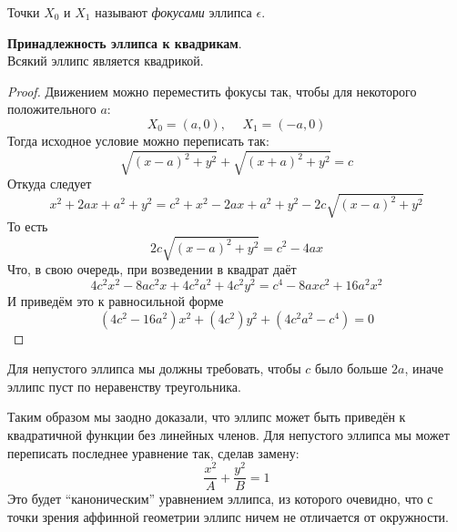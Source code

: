 \documentclass[11pt]{article}
\begin{document}
    \begin{remark}
    Точки $X_0$ и $X_1$ называют \emph{фокусами} эллипса $\epsilon$.
    \end{remark}

    \begin{lemma}
    \textbf{Принадлежность эллипса к квадрикам}.\\ Всякий эллипс является квадрикой.
    \end{lemma}

    \begin{proof}
    Движением можно переместить фокусы так, чтобы для некоторого положительного $a$:
    \begin{equation*}
        X_0 = (a, 0), \hspace{15pt} X_1 = (-a, 0)
    \end{equation*}
    Тогда исходное условие можно переписать так:
    \begin{equation*}
        \sqrt{(x - a)^2 + y^2} + \sqrt{(x + a)^2 + y^2} = c
    \end{equation*}
    Откуда следует
    \begin{equation*}
        x^2 + 2ax + a^2 + y^2 = c^2 + x^2 -2ax + a^2 + y^2 - 2c\sqrt{(x - a)^2 + y^2}
    \end{equation*}
    То есть
    \begin{equation*}
        2c\sqrt{(x - a)^2 + y^2} = c^2 - 4ax
    \end{equation*}
    Что, в свою очередь, при возведении в квадрат даёт
    \begin{equation*}
        4c^2x^2 - 8ac^2x + 4c^2a^2 + 4c^2y^2 = c^4 - 8axc^2 + 16a^2x^2
    \end{equation*}
    И приведём это к равносильной форме
    \begin{equation*}
        (4c^2 - 16a^2)x^2 + (4c^2)y^2 + (4c^2a^2 - c^4) = 0
    \end{equation*}
    \end{proof}

    \begin{remark}
    Для непустого эллипса мы должны требовать, чтобы $c$ было больше $2a$, иначе эллипс пуст по неравенству треугольника.
    \end{remark}

    \begin{remark}
    Таким образом мы заодно доказали, что эллипс может быть приведён к квадратичной функции без линейных членов. Для непустого эллипса мы может переписать последнее уравнение так, сделав замену:
    \begin{equation*}
        \dfrac{x^2}{A} + \dfrac{y^2}{B} = 1
    \end{equation*}
    Это будет ``каноническим'' уравнением эллипса, из которого очевидно, что с точки зрения аффинной геометрии эллипс ничем не отличается от окружности.
    \end{remark}
\end{document}
